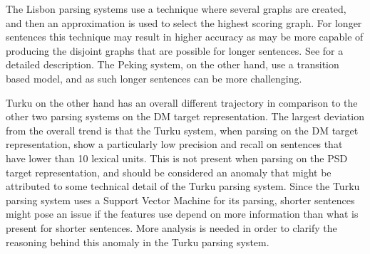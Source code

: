 The Lisbon parsing systems use a technique where several graphs are created, and then an approximation is used to select the highest scoring graph. For longer sentences this technique may result in higher accuracy as may be more capable of producing the disjoint graphs that are possible for longer sentences. See  for a detailed description. The Peking system, on the other hand, use a transition based model, and as such longer sentences can be more challenging. 

Turku on the other hand has an overall different trajectory in comparison to the other two parsing systems on the DM target representation. The largest deviation from the overall trend is that the Turku system, when parsing on the DM target representation, show a particularly low precision and recall on sentences that have lower than 10 lexical units. This is not present when parsing on the PSD target representation, and should be considered an anomaly that might be attributed to some technical detail of the Turku parsing system. Since the Turku parsing system uses a Support Vector Machine for its parsing, shorter sentences might pose an issue if the features use depend on more information than what is present for shorter sentences. More analysis is needed in order to clarify the reasoning behind this anomaly in the Turku parsing system.





